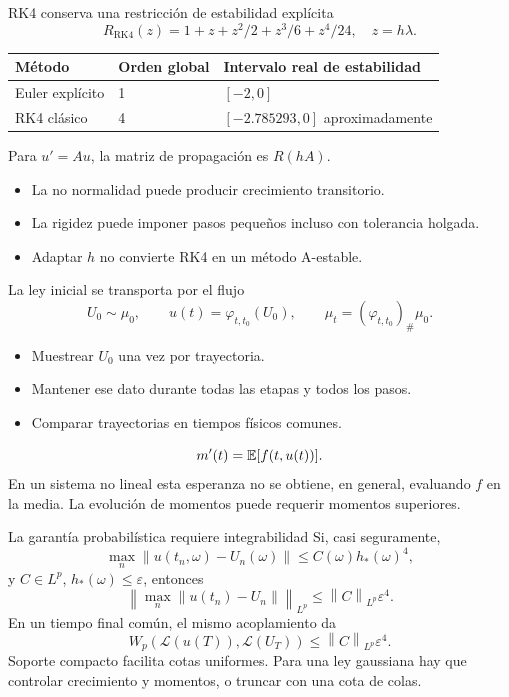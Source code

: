 \documentclass[aspectratio=169,11pt]{beamer}
\newcommand{\norm}[1]{\left\lVert#1\right\rVert}
\begin{document}
\begin{frame}{RK4 conserva una restricción de estabilidad explícita}
\[
R_{\mathrm{RK4}}(z)=1+z+z^2/2+z^3/6+z^4/24,
\quad z=h\lambda.
\]
\renewcommand{\arraystretch}{1.3}
\small
\begin{tabularx}{0.98\linewidth}{@{}lXX@{}}\toprule
Método & Orden global & Intervalo real de estabilidad\\\midrule
Euler explícito & 1 & $[-2,0]$\\
RK4 clásico & 4 & $[-2.785293,0]$ aproximadamente\\\bottomrule
\end{tabularx}\par
\par\vspace{0.45cm}
Para $u'=Au$, la matriz de propagación es $R(hA)$.
\begin{itemize}
\item La no normalidad puede producir crecimiento transitorio.
\item La rigidez puede imponer pasos pequeños incluso con tolerancia holgada.
\item Adaptar $h$ no convierte RK4 en un método A-estable.
\end{itemize}
\end{frame}

\begin{frame}{La ley inicial se transporta por el flujo}
\[
U_0\sim\mu_0,\qquad u(t)=\varphi_{t,t_0}(U_0),\qquad
\mu_t=(\varphi_{t,t_0})_\#\mu_0.
\]
\begin{itemize}
\item Muestrear $U_0$ una vez por trayectoria.
\item Mantener ese dato durante todas las etapas y todos los pasos.
\item Comparar trayectorias en tiempos físicos comunes.
\end{itemize}
\[
m'(t)=\mathbb E[f(t,u(t))].
\]
En un sistema no lineal esta esperanza no se obtiene, en general, evaluando
$f$ en la media. La evolución de momentos puede requerir momentos superiores.
\end{frame}

\begin{frame}{La garantía probabilística requiere integrabilidad}
Si, casi seguramente,
\[
\max_n\norm{u(t_n,\omega)-U_n(\omega)}
\leq C(\omega)h_*(\omega)^4,
\]
y $C\in L^p$, $h_*(\omega)\leq\varepsilon$, entonces
\[
\left\|\max_n\norm{u(t_n)-U_n}\right\|_{L^p}
\leq\norm{C}_{L^p}\varepsilon^4.
\]
En un tiempo final común, el mismo acoplamiento da
\[
W_p(\mathcal L(u(T)),\mathcal L(U_T))\leq\norm{C}_{L^p}\varepsilon^4.
\]
\small Soporte compacto facilita cotas uniformes. Para una ley gaussiana hay
que controlar crecimiento y momentos, o truncar con una cota de colas.
\end{frame}
\end{document}
